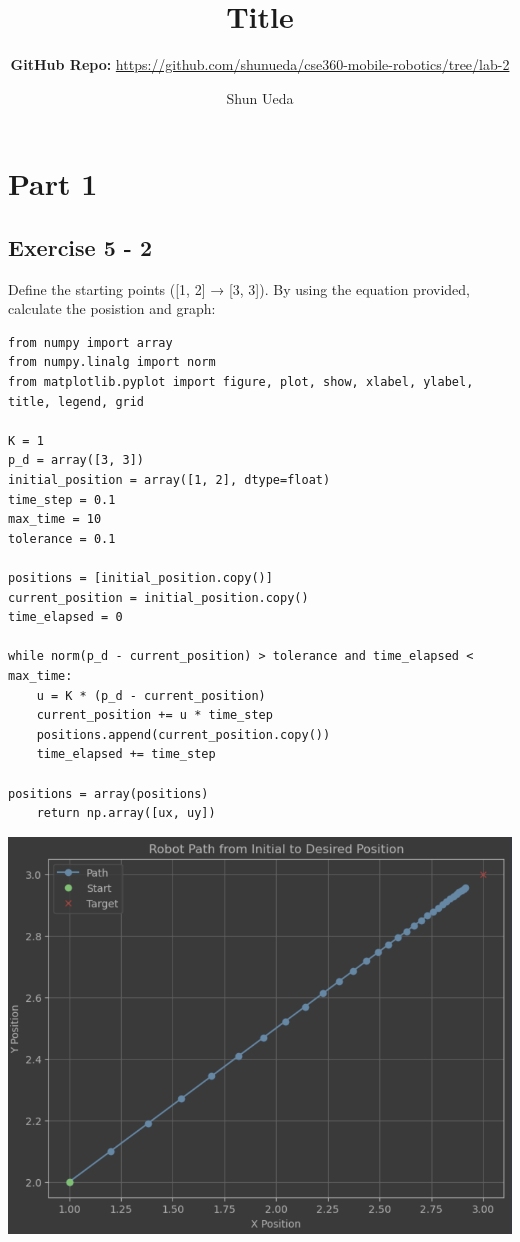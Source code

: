 \documentclass[letterpaper, 10 pt, conference]{ieeeconf}  %
\title{\LARGE \bf Title}
\author{Shun Ueda}
\begin{document}
    \maketitle
    \thispagestyle{empty}
    \pagestyle{empty}

    \subtitle{\textbf{GitHub Repo:} \url{https://github.com/shunueda/cse360-mobile-robotics/tree/lab-2}}


    \section{Part 1}

    \subsection{Exercise 5 - 2}

    Define the starting points ([1, 2] → [3, 3]).
    By using the equation provided, calculate the posistion and graph:

    \begin{lstlisting}[label={lst:lstlisting1}]
from numpy import array
from numpy.linalg import norm
from matplotlib.pyplot import figure, plot, show, xlabel, ylabel, title, legend, grid

K = 1
p_d = array([3, 3])
initial_position = array([1, 2], dtype=float)
time_step = 0.1
max_time = 10
tolerance = 0.1

positions = [initial_position.copy()]
current_position = initial_position.copy()
time_elapsed = 0

while norm(p_d - current_position) > tolerance and time_elapsed < max_time:
    u = K * (p_d - current_position)
    current_position += u * time_step
    positions.append(current_position.copy())
    time_elapsed += time_step

positions = array(positions)
    return np.array([ux, uy])
    \end{lstlisting}

    \begin{center}
        \includegraphics[scale=0.4]{1-1}
    \end{center}
\end{document}
